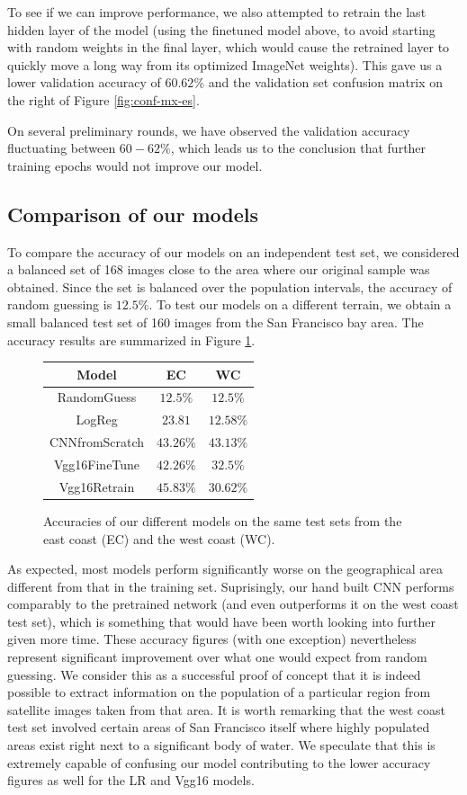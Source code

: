 \documentclass{article}
\begin{document}
To see if we can improve performance, we also attempted to retrain the last hidden layer of the model (using the finetuned model above, to avoid starting with random weights in the final layer, which would cause the retrained layer to quickly move a long way from its optimized ImageNet weights). This gave us a lower validation accuracy of $60.62\%$ and the validation set confusion matrix on the right of Figure \ref{fig:conf-mx-es}.

On several preliminary rounds, we have observed the validation accuracy fluctuating between $60-62\%$, which leads us to the conclusion that further training epochs would not improve our model.



\subsection{Comparison of our models}
To compare the accuracy of our models on an independent test set, we considered a balanced set of 168 images close to the area where our original sample was obtained. Since the set is balanced over the population intervals, the accuracy of random guessing is $12.5\%$. To test our models on a different terrain, we obtain a small balanced test set of 160 images from the San Francisco bay area. The accuracy results are summarized in Figure \ref{fig:accur-comp}.

\begin{figure}[ht]
\center
\begin{tabular}{ |c|c|c| } 
\hline
Model & EC & WC\\
\hline
RandomGuess & $12.5\%$ & $12.5\%$\\
LogReg& $23.81$ & $12.58\%$\\ 
CNNfromScratch & $43.26\%$ & $43.13\%$\\ 
Vgg16FineTune& $42.26\%$ & $32.5\%$\\
Vgg16Retrain& $45.83\%$ & $30.62\%$\\
\hline
\end{tabular}
\caption{Accuracies of our different models on the same test sets from the east coast (EC) and the west coast (WC).}
\label{fig:accur-comp}
\end{figure}

As expected, most models perform significantly worse on the geographical area different from that in the training set. Suprisingly, our hand built CNN performs comparably to the pretrained network (and even outperforms it on the west coast test set), which is something that would have been worth looking into further given more time. These accuracy figures (with one exception) nevertheless represent significant improvement over what one would expect from random guessing. We consider this as a successful proof of concept that it is indeed possible to extract information on the population of a particular region from satellite images taken from that area. It is worth remarking that the west coast test set involved certain areas of San Francisco itself where highly populated areas exist right next to a significant body of water. We speculate that this is extremely capable of confusing our model contributing to the lower accuracy figures as well for the LR and Vgg16 models.
\end{document}
